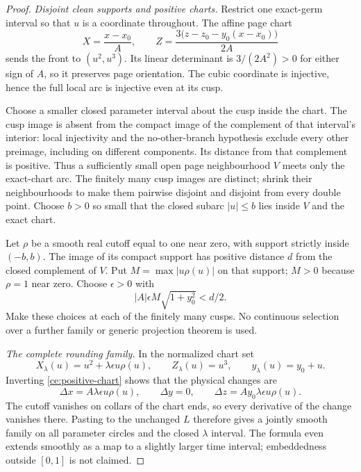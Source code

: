 \begin{proof}
\par\noindent\emph{Disjoint clean supports and positive charts.} 
Restrict one exact-germ interval so that $u$ is a coordinate throughout.
The affine page chart
\begin{equation}\label{ce:positive-chart}
 X=\frac{x-x_0}{A},\qquad
 Z=\frac{3\bigl(z-z_0-y_0(x-x_0)\bigr)}{2A}
\end{equation}
sends the front to $(u^2,u^3)$. Its linear determinant is
$3/(2A^2)>0$ for either sign of $A$, so it preserves page orientation.
The cubic coordinate is injective, hence the full local arc is injective
even at its cusp.

Choose a smaller closed parameter interval about the cusp inside the
chart. The cusp image is absent from the compact image of the complement
of that interval's interior: local injectivity and the no-other-branch
hypothesis exclude
every other preimage, including on different components. Its distance
from that complement is positive. Thus a sufficiently small open page
neighbourhood $V$ meets only the exact-chart arc. The finitely many cusp
images are distinct; shrink their neighbourhoods to make them pairwise
disjoint and disjoint from every double point. Choose $b>0$ so small
that the closed subarc $|u|\leq b$ lies inside $V$ and the exact chart.

Let $\rho$ be a smooth real cutoff equal to one near zero, with support
strictly inside $(-b,b)$. The image of its compact support has positive
distance $d$ from the closed complement of $V$. Put
$M=\max|u\rho(u)|$ on that support; $M>0$ because $\rho=1$ near zero.
Choose $\epsilon>0$ with
\begin{equation}\label{ce:support-clearance}
 |A|\epsilon M\sqrt{1+y_0^2}<d/2.
\end{equation}
Make these choices at each of the finitely many cusps. No continuous
selection over a further family or generic projection theorem is used.

\par\noindent\emph{The complete rounding family.} 
In the normalized chart set
\begin{equation}\label{ce:rounding-formula}
 X_\lambda(u)=u^2+\lambda\epsilon u\rho(u),\qquad
 Z_\lambda(u)=u^3,\qquad y_\lambda(u)=y_0+u.
\end{equation}
Inverting \eqref{ce:positive-chart} shows that the physical changes are
\begin{equation}\label{ce:physical-displacement}
 \Delta x=A\lambda\epsilon u\rho(u),\qquad \Delta y=0,\qquad
 \Delta z=Ay_0\lambda\epsilon u\rho(u).
\end{equation}
The cutoff vanishes on collars of the chart ends, so every derivative
of the change vanishes there. Pasting to the unchanged $L$ therefore
gives a jointly smooth family on all parameter circles and the closed
$\lambda$ interval. The formula even extends smoothly as a map to a
slightly larger time interval; embeddedness outside $[0,1]$ is not claimed.


\end{proof}
